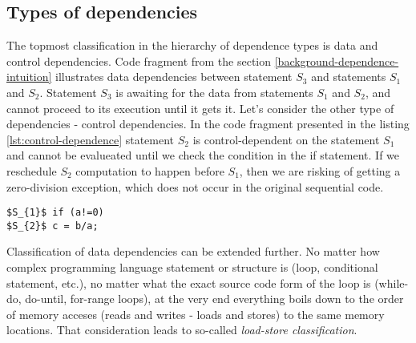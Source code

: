 \subsection{Types of dependencies} 
\label{background-dependence-types}
\qquad The topmost classification in the hierarchy of dependence types is data and control dependencies. Code fragment from the section \ref{background-dependence-intuition} illustrates data dependencies between statement $S_{3}$ and statements $S_{1}$ and $S_{2}$. Statement $S_{3}$ is awaiting for the data from statements $S_{1}$ and $S_{2}$, and cannot proceed to its execution until it gets it.\newline
\null\qquad Let's consider the other type of dependencies - control dependencies. In the code fragment presented in the listing \ref{lst:control-dependence} statement $S_{2}$ is control-dependent on the statement $S_{1}$ and cannot be evalueated until we check the condition in the if statement. If we reschedule $S_{2}$ computation to happen before $S_{1}$, then we are risking of getting a zero-division exception, which does not occur in the original sequential code.\newline
\begin{lstlisting}[caption={Code illustrating the notion of control dependence. Statement $S_{2}$ is control-dependent on the statement $S_{1}$.}, captionpos=b, label=lst:control-dependence, float, floatplacement=H, mathescape=true]
$S_{1}$ if (a!=0)
$S_{2}$	c = b/a;
\end{lstlisting}
\null\qquad Classification of data dependencies can be extended further. No matter how complex programming language statement or structure is (loop, conditional statement, etc.), no matter what the exact source code form of the loop is (while-do, do-until, for-range loops), at the very end everything boils down to the order of memory acceses (reads and writes - loads and stores) to the same memory locations. That consideration leads to so-called \textit{load-store classification}.

